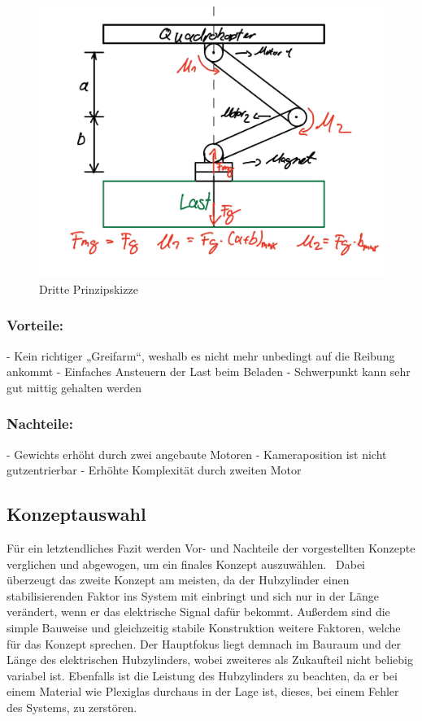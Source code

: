 \begin{figure}
\begin{center}
\includegraphics[scale=0.5]{Grafiken/Skizze3mechanik.jpg}
\caption{Dritte Prinzipskizze}
\label{dritte_prinzipskizze}
\end{center}
\end{figure}

\subsubsection{Vorteile:}
-	Kein richtiger „Greifarm“, weshalb es nicht mehr unbedingt auf die Reibung ankommt
-	Einfaches Ansteuern der Last beim Beladen
-	Schwerpunkt kann sehr gut mittig gehalten werden

\subsubsection{Nachteile:}
-	Gewichts erhöht durch zwei angebaute Motoren
-	Kameraposition ist nicht gutzentrierbar 
-	Erhöhte Komplexität durch zweiten Motor

\subsection{Konzeptauswahl}
Für ein letztendliches Fazit werden Vor- und Nachteile der vorgestellten Konzepte verglichen und abgewogen, um ein finales Konzept auszuwählen.
\
Dabei überzeugt das zweite Konzept am meisten, da der Hubzylinder einen stabilisierenden Faktor ins System mit einbringt und sich nur in der Länge verändert, wenn er das elektrische Signal dafür bekommt. Außerdem sind die simple Bauweise und gleichzeitig stabile Konstruktion weitere Faktoren, welche für das Konzept sprechen. Der Hauptfokus liegt demnach im Bauraum und der Länge des elektrischen Hubzylinders, wobei zweiteres als Zukaufteil nicht beliebig variabel ist. Ebenfalls ist die Leistung des Hubzylinders zu beachten, da er bei einem Material wie Plexiglas durchaus in der Lage ist, dieses, bei einem Fehler des Systems, zu zerstören.

